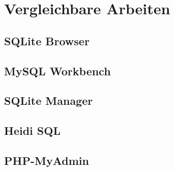 \section{Vergleichbare Arbeiten}
\label{sec02:vergleichbare_arbeiten}

\subsection{SQLite Browser}
\label{sec02:sqlite_browser}

\subsection{MySQL Workbench}
\label{sec02:mysql_workbench}

\subsection{SQLite Manager}
\label{sec02:sqlite_manager}

\subsection{Heidi SQL}
\label{sec02:heidi_sql}

\subsection{PHP-MyAdmin}
\label{sec02:php_myadmin}

